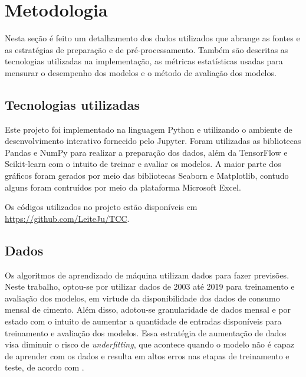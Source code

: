 
\chapter{Metodologia}



Nesta seção é feito um detalhamento dos dados utilizados que 
abrange as fontes e as estratégias de preparação e de pré-processamento. 
Também são descritas as 
tecnologias utilizadas na implementação, as métricas estatísticas 
usadas para mensurar o desempenho dos modelos e o método de
 avaliação dos modelos.

\section{Tecnologias utilizadas}

Este projeto foi implementado na linguagem Python e 
utilizando o ambiente de desenvolvimento interativo fornecido pelo Jupyter.
Foram utilizadas as bibliotecas Pandas e NumPy para realizar a preparação dos dados,
além da TensorFlow e Scikit-learn com o intuito de treinar e avaliar os modelos.
A maior parte dos gráficos foram gerados por meio das bibliotecas 
Seaborn e Matplotlib, contudo alguns foram contruídos por meio da plataforma
Microsoft Excel.

Os códigos utilizados no projeto estão disponíveis em \url{https://github.com/LeiteJu/TCC}.

\section{Dados}
\label{sec:dados}

Os algoritmos de aprendizado de máquina utilizam dados para fazer 
previsões. 
Neste trabalho, optou-se por utilizar dados de 2003 até 2019 para treinamento e 
avaliação dos modelos, em virtude da disponibilidade dos dados de consumo mensal 
de cimento. Além disso,
adotou-se granularidade de dados
mensal e por estado com o intuito de aumentar a quantidade de entradas disponíveis 
para treinamento e avaliação dos modelos.
Essa estratégia de aumentação de dados visa diminuir o risco de  
\textit{underfitting}, que acontece quando o 
modelo não é capaz de aprender com os dados e resulta em altos erros nas etapas de
treinamento e teste, de acordo com \citet{Goodfellow-et-al-2016}.


